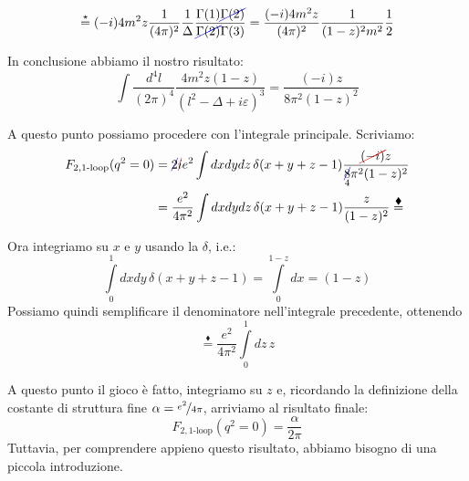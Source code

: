 \documentclass[../main.tex]{subfiles}
\begin{document}
\[
\overset{\star}{=} (-i)4m^2z\frac{1}{(4\pi)^2}\frac{1}{\Delta}\frac{\Gamma(1)\Ccancel[blue]{\Gamma(2)}}{\Ccancel[blue]{\Gamma(2)}\Gamma(3)} = \frac{(-i)4m^2z}{(4\pi)^2}\frac{1}{ (1-z)^2m^2}\frac{1}{2}
\]

In conclusione abbiamo il nostro risultato:
\[
\boxed{\int \frac{d^4 l}{(2\pi)^4} \frac{4m^2z(1-z)}{(l^2-\Delta+i\varepsilon)^3} = \frac{(-i)z}{8\pi^2(1-z)^2}}
\]

A questo punto possiamo procedere con l'integrale principale. Scriviamo:
\begin{align*}
    F_{2,\text{1-loop}}(q^2=0) &= \Ccancel[blue]{2}\Ccancel[red]{i}e^2\int dxdydz \,\delta(x+y+z-1) \frac{\Ccancel[red]{(-i)}z}{\underset{4}{\Ccancel[blue]{8}}\pi^2(1-z)^2}\\
    &=\frac{e^2}{4\pi^2}\int dxdydz \,\delta(x+y+z-1) \frac{z}{(1-z)^2} \overset{\blacklozenge}{=}
\end{align*}

Ora integriamo su $x$ e $y$ usando la $\delta$, i.e.:
\[
\int\limits_0^1 dxdy \,\delta(x+y+z-1)=\int\limits_0^{1-z} dx = (1-z)
\]
Possiamo quindi semplificare il denominatore nell'integrale precedente, ottenendo
\[
\overset{\blacklozenge}{=} \frac{e^2}{4\pi^2}\int\limits_0^1 dz \, z
\]

A questo punto il gioco è fatto, integriamo su $z$ e, ricordando la definizione della costante di struttura fine $\alpha = \nicefrac{e^2}{4\pi}$, arriviamo al risultato finale:
\begin{equation}
    \boxed{F_{2,\text{1-loop}}(q^2=0) = \frac{\alpha}{2\pi}}
    \label{eq:F2_q0}
\end{equation}
Tuttavia, per comprendere appieno questo risultato, abbiamo bisogno di una piccola introduzione.
\end{document}
